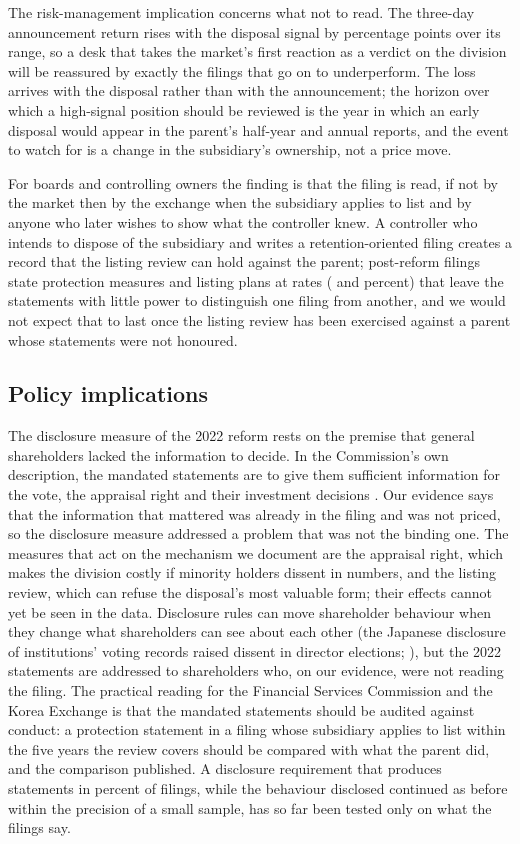 The risk-management implication concerns what not to read. The three-day announcement return rises with the disposal signal by \AnnCarSlopePP{} percentage points over its range, so a desk that takes the market's first reaction as a verdict on the division will be reassured by exactly the filings that go on to underperform. The loss arrives with the disposal rather than with the announcement; the horizon over which a high-signal position should be reviewed is the year in which an early disposal would appear in the parent's half-year and annual reports, and the event to watch for is a change in the subsidiary's ownership, not a price move.

For boards and controlling owners the finding is that the filing is read, if not by the market then by the exchange when the subsidiary applies to list and by anyone who later wishes to show what the controller knew. A controller who intends to dispose of the subsidiary and writes a retention-oriented filing creates a record that the listing review can hold against the parent; post-reform filings state protection measures and listing plans at rates (\ProtectPost{} and \ListingPost{} percent) that leave the statements with little power to distinguish one filing from another, and we would not expect that to last once the listing review has been exercised against a parent whose statements were not honoured.

\subsection{Policy implications}\label{sec:policy}

The disclosure measure of the 2022 reform rests on the premise that general shareholders lacked the information to decide. In the Commission's own description, the mandated statements are to give them sufficient information for the vote, the appraisal right and their investment decisions \cite{fsc2022b}. Our evidence says that the information that mattered was already in the filing and was not priced, so the disclosure measure addressed a problem that was not the binding one. The measures that act on the mechanism we document are the appraisal right, which makes the division costly if minority holders dissent in numbers, and the listing review, which can refuse the disposal's most valuable form; their effects cannot yet be seen in the data. Disclosure rules can move shareholder behaviour when they change what shareholders can see about each other (the Japanese disclosure of institutions' voting records raised dissent in director elections; ), but the 2022 statements are addressed to shareholders who, on our evidence, were not reading the filing. The practical reading for the Financial Services Commission and the Korea Exchange is that the mandated statements should be audited against conduct: a protection statement in a filing whose subsidiary applies to list within the five years the review covers should be compared with what the parent did, and the comparison published. A disclosure requirement that produces statements in \ProtectPost{} percent of filings, while the behaviour disclosed continued as before within the precision of a small sample, has so far been tested only on what the filings say.

